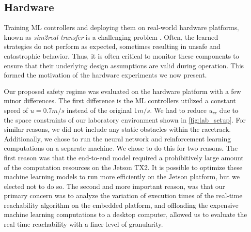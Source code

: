 \documentclass[manuscript,screen,review]{acmart}
\newcommand{\ttj}[1]{\textcolor{red}{\textbf{\underline{TTJ:}} #1}}
\begin{document}
\subsection{Hardware}
Training ML controllers and deploying them on real-world hardware platforms, known as \textit{sim2real transfer} is a challenging problem \cite{jang2019ICCPS, kadian2019we}. Often, the learned strategies do not perform as expected, sometimes resulting in unsafe and catastrophic behavior. Thus, it is often critical to monitor these components to ensure that their underlying design assumptions are valid during operation. This formed the motivation of the hardware experiments we now present.

Our proposed safety regime was  evaluated on the hardware platform with a few minor differences. The first difference is the ML controllers utilized a constant speed of $u = 0.7  m/s$ instead of the original $1  m/s$. We had to reduce $u_{cc}$ due to the space constraints of our laboratory environment shown in \ref{fig:lab_setup}. For similar reasons, we did not include any static obstacles within the racetrack. %
Additionally, we chose to run the neural network and reinforcement learning computations on a separate machine. We chose to do this for two reasons. The first reason was that the end-to-end model required a prohibitively large amount of the computation resources on the Jetson TX2. It is possible to optimize these machine learning models to run more efficiently on the Jetson platform, but we elected not to do so. The second and more important reason, was that our primary concern was to analyze the variation of execution times of the real-time reachability algorithm on the embedded platform, and offloading the expensive machine learning computations to a desktop computer, allowed us to evaluate the real-time reachability with a finer level of granularity.
\end{document}

